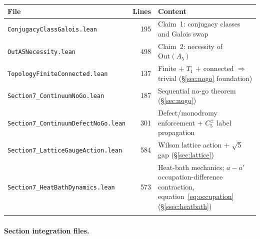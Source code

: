 \documentclass[sn-mathphys-num,Numbered]{sn-jnl}
\theoremstyle{thmstyleone}
\theoremstyle{thmstylethree}
\theoremstyle{thmstyletwo}
\begin{document}
\begin{appendices}
\vspace{6pt}
\noindent{}
\label{tab:lean-core}
\begin{tabular}{@{}p{5.8cm}rp{4.8cm}@{}}
\toprule
File & Lines & Content \\
\midrule
\texttt{ConjugacyClassGalois.lean} & 195 &
  Claim~1: conjugacy classes and Galois swap \\
\texttt{OutA5Necessity.lean} & 498 &
  Claim~2: necessity of $\mathrm{Out}(A_5)$ \\
\texttt{TopologyFiniteConnected.lean} & 137 &
  Finite $+$ $T_1$ $+$ connected $\Rightarrow$ trivial
  (\S\ref{sec:nogo} foundation) \\
\texttt{Section7\_ContinuumNoGo.lean} & 187 &
  Sequential no-go theorem (\S\ref{sec:nogo}) \\
\texttt{Section7\_ContinuumDefectNoGo.lean} & 301 &
  Defect/monodromy enforcement $+$ $C_5^\pm$ label propagation \\
\texttt{Section7\_LatticeGaugeAction.lean} & 584 &
  Wilson lattice action $+$ $\sqrt{5}$ gap (\S\ref{sec:lattice}) \\
\texttt{Section7\_HeatBathDynamics.lean} & 573 &
  Heat-bath mechanics; $a-a'$ occupation-difference
  contraction, equation~\eqref{eq:occupation} (\S\ref{ssec:heatbath}) \\
\botrule
\end{tabular}
\vspace{4pt}


\paragraph{Section integration files.}



\end{appendices}
\end{document}
